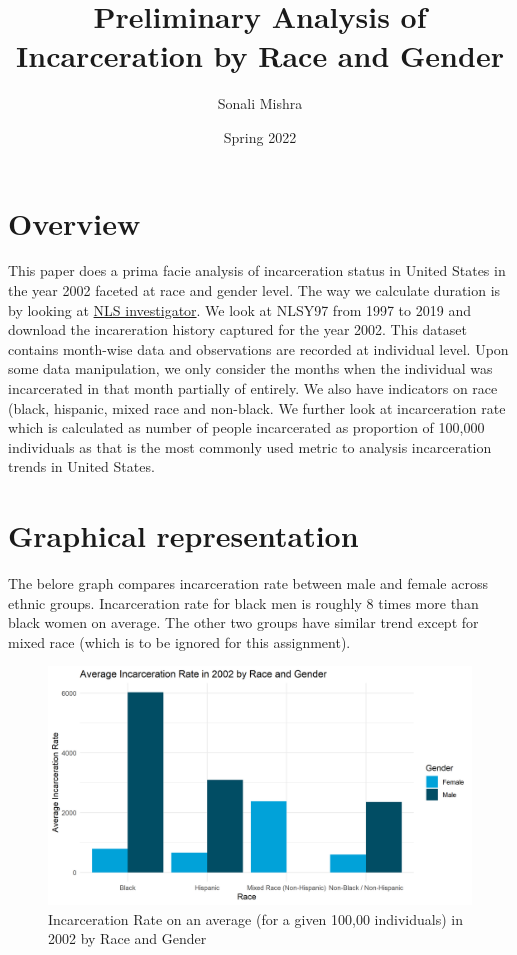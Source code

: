 \documentclass{article}
\author{Sonali Mishra}
\title{Preliminary Analysis of Incarceration by Race and Gender}
\date{Spring 2022}
\begin{document}
\maketitle

\section{Overview}

This paper does a prima facie analysis of incarceration status in United States in the year 2002 faceted at race and gender level. The way we calculate duration is by looking at \href{https://www.nlsinfo.org/investigator/pages/search}{NLS investigator}. We look at NLSY97 from 1997 to 2019 and download the incareration history captured for the year 2002. This dataset contains month-wise data and observations are recorded at individual level. Upon some data manipulation, we only consider the months when the individual was incarcerated in that month partially of entirely. We also have indicators on race (black, hispanic, mixed race and non-black. We further look at incarceration rate which is calculated as number of people incarcerated as proportion of 100,000 individuals as that is the most commonly used metric to analysis incarceration trends in United States.

\section{Graphical representation}

The belore graph compares incarceration rate between male and female across ethnic groups. Incarceration rate for black men is roughly 8 times more than black women on average. The other two groups have similar trend except for mixed race (which is to be ignored for this assignment). 

\begin{figure}[H]
    \begin{center}
        \includegraphics[width=.85\textwidth]{incar_rate_by_racegender}
    \end{center}
    \caption{Incarceration Rate on an average (for a given 100,00 individuals) in 2002 by Race and Gender}
    \label{fig:graph}
\end{figure}
\end{document}
